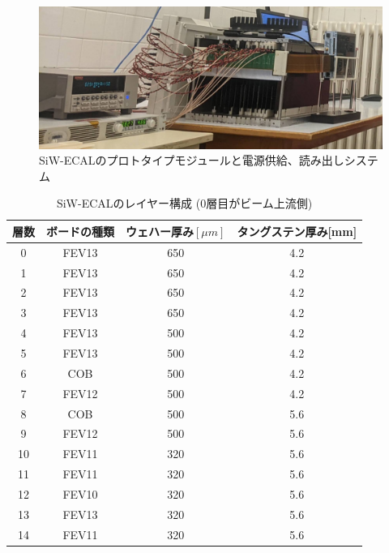 \begin{figure}[H]
\begin{center}
 \includegraphics[keepaspectratio, scale=0.2]
 	{Figure/Beamtest/setup2.png}
 		\caption{SiW-ECALのプロトタイプモジュールと電源供給、読み出しシステム}
		\label{setup2}
\end{center}
\end{figure}

\begin{table}[H]
 \centering
 \begin{tabular}{|c|c|c|c|}
 \hline
層数 & ボードの種類 & ウェハー厚み$[\mu m]$ & タングステン厚み[mm]\\
 \hline
 \hline
0 & FEV13 & 650 & 4.2\\
1 & FEV13 & 650 & 4.2\\
2 & FEV13 & 650 & 4.2\\
3 & FEV13 & 650 & 4.2\\
4 & FEV13 & 500 & 4.2\\
5 & FEV13 & 500 & 4.2\\
6 & COB & 500 & 4.2\\
7 & FEV12 & 500 & 4.2\\
8 & COB & 500 & 5.6\\
9 & FEV12 & 500 & 5.6\\
10 & FEV11 & 320 & 5.6\\
11 & FEV11 & 320 & 5.6\\
12 & FEV10 & 320 & 5.6\\
13 & FEV13 & 320 & 5.6\\
14 & FEV11 & 320 & 5.6\\
 \hline
 \end{tabular}
 \label{layer}
 \caption{SiW-ECALのレイヤー構成 (0層目がビーム上流側) }
\end{table}
